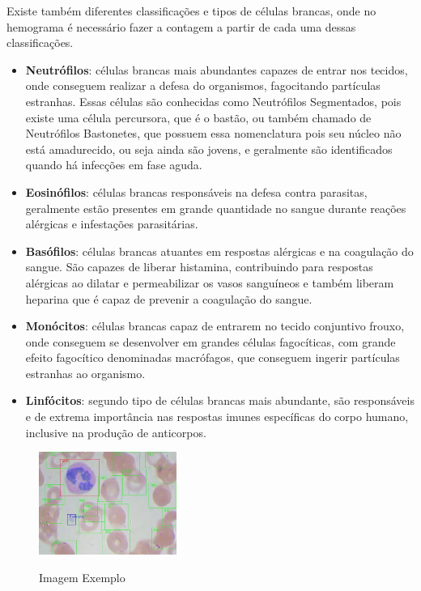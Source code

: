 Existe também diferentes classificações e tipos de células brancas, onde no hemograma é necessário fazer a contagem a partir de cada uma dessas classificações.

\begin{itemize}
    \item \textbf{Neutrófilos}: células brancas mais abundantes capazes de entrar nos tecidos, onde conseguem realizar a defesa do organismos, fagocitando partículas estranhas. Essas células são conhecidas como Neutrófilos Segmentados, pois existe uma célula percursora, que é o bastão, ou também chamado de Neutrófilos Bastonetes, que possuem essa nomenclatura pois seu núcleo não está amadurecido, ou seja ainda são jovens, e geralmente são identificados quando há infecções em fase aguda. 
    \item \textbf{Eosinófilos}: células brancas responsáveis na defesa contra parasitas, geralmente estão presentes em grande quantidade no sangue durante reações alérgicas e infestações parasitárias.
    \item \textbf{Basófilos}: células brancas atuantes em respostas alérgicas e na coagulação do sangue. São capazes de liberar histamina, contribuindo para respostas alérgicas ao dilatar e permeabilizar os vasos sanguíneos e também liberam heparina que é capaz de prevenir a coagulação do sangue.
    \item \textbf{Monócitos}: células brancas capaz de entrarem no tecido conjuntivo frouxo, onde conseguem se desenvolver em grandes células fagocíticas, com grande efeito fagocítico denominadas macrófagos, que conseguem ingerir partículas estranhas ao organismo.
    \item \textbf{Linfócitos}: segundo tipo de células brancas mais abundante, são responsáveis e de extrema importância nas respostas imunes específicas do corpo humano, inclusive na produção de anticorpos.
\end{itemize}

\begin{figure}[!htb]
    \centering
    \caption{Imagem Exemplo}
    \includegraphics[width=0.40\textwidth]{img/example.jpg}
    \label{fig:exemplo2}
 \end{figure}
 
